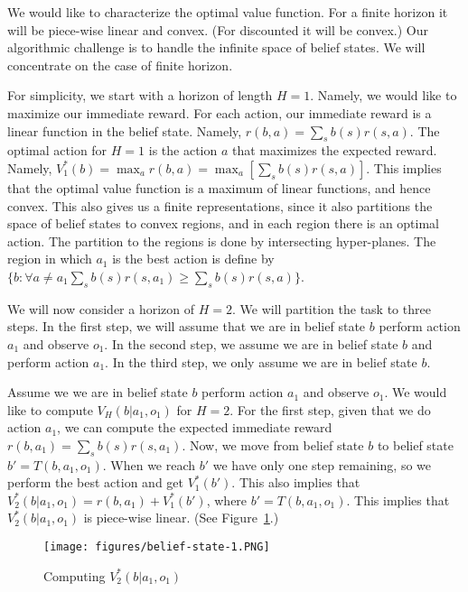 We would like to characterize the optimal value function. For a finite horizon it will be piece-wise linear and convex. (For discounted it will be convex.) Our algorithmic challenge is to handle the infinite space of belief states. We will concentrate on the case of finite horizon.

For simplicity, we start with a horizon of length $H=1$. Namely, we would like to maximize our immediate reward. For each action, our immediate reward is a linear function in the belief state. Namely, $r(b,a)=\sum_s b(s)r(s,a)$. The optimal action for $H=1$ is the action $a$ that maximizes the expected reward. Namely, $V^*_1(b)=\max_a r(b,a)=\max_a [\sum_s b(s)r(s,a)]$. This implies that the optimal value function is a maximum of linear functions, and hence convex. This also gives us a finite representations, since it also partitions the space of belief states to convex regions, and in each region there is an optimal action. The partition to the regions is done by intersecting hyper-planes. The region in which $a_1$ is the best action is define by $\{b: \forall a\neq a_1 \sum_s b(s)r(s,a_1)\geq \sum_s b(s)r(s,a)\}$.

We will now consider a horizon of $H=2$. We will partition the task to three steps. In the first step, we will assume that we are in belief state $b$ perform action $a_1$ and observe $o_1$. In the second step, we assume we are in belief state $b$ and perform action $a_1$. In the third step, we only assume we are in belief state $b$.

Assume we  we are in belief state $b$ perform action $a_1$ and observe $o_1$. We would like to compute $V_H(b|a_1,o_1)$ for $H=2$. For the first step, given that we do action $a_1$, we can compute the expected immediate reward $r(b,a_1)=\sum_s b(s)r(s,a_1)$. Now, we move from belief state $b$ to belief state $b'=T(b,a_1,o_1)$. When we reach $b'$ we have only one step remaining, so we perform the best action and get $V^*_1(b')$. This also implies that $V^*_2(b|a_1,o_1)=r(b,a_1)+V^*_1(b')$, where $b'=T(b,a_1,o_1)$. This implies that $V^*_2(b|a_1,o_1)$ is piece-wise linear.  (See Figure~\ref{fig:belief-state-1}.)

\begin{figure}
  \begin{centering}
  \texttt{[image: figures/belief-state-1.PNG]}\\
  \caption{Computing $V^*_2(b|a_1,o_1)$}\label{fig:belief-state-1}
  \end{centering}
\end{figure}

